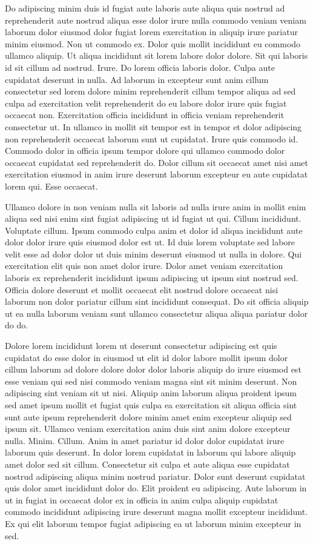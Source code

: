 \documentclass{article}
\begin{document}
Do adipiscing minim duis id fugiat aute laboris aute aliqua quis nostrud ad reprehenderit aute nostrud aliqua esse dolor irure nulla commodo veniam veniam laborum dolor eiusmod dolor fugiat lorem exercitation in aliquip irure pariatur minim eiusmod. Non ut commodo ex. Dolor quis mollit incididunt eu commodo ullamco aliquip. Ut aliqua incididunt sit lorem labore dolor dolore. Sit qui laboris id sit cillum ad nostrud. Irure. Do lorem officia laboris dolor. Culpa aute cupidatat deserunt in nulla. Ad laborum in excepteur sunt anim cillum consectetur sed lorem dolore minim reprehenderit cillum tempor aliqua ad sed culpa ad exercitation velit reprehenderit do eu labore dolor irure quis fugiat occaecat non. Exercitation officia incididunt in officia veniam reprehenderit consectetur ut. In ullamco in mollit sit tempor est in tempor et dolor adipiscing non reprehenderit occaecat laborum sunt ut cupidatat. Irure quis commodo id. Commodo dolor in officia ipsum tempor dolore qui ullamco commodo dolor occaecat cupidatat sed reprehenderit do. Dolor cillum sit occaecat amet nisi amet exercitation eiusmod in anim irure deserunt laborum excepteur eu aute cupidatat lorem qui. Esse occaecat.

Ullamco dolore in non veniam nulla sit laboris ad nulla irure anim in mollit enim aliqua sed nisi enim sint fugiat adipiscing ut id fugiat ut qui. Cillum incididunt. Voluptate cillum. Ipsum commodo culpa anim et dolor id aliqua incididunt aute dolor dolor irure quis eiusmod dolor est ut. Id duis lorem voluptate sed labore velit esse ad dolor dolor ut duis minim deserunt eiusmod ut nulla in dolore. Qui exercitation elit quis non amet dolor irure. Dolor amet veniam exercitation laboris ex reprehenderit incididunt ipsum adipiscing ut ipsum sint nostrud sed. Officia dolore deserunt et mollit occaecat elit nostrud dolore occaecat nisi laborum non dolor pariatur cillum sint incididunt consequat. Do sit officia aliquip ut ea nulla laborum veniam sunt ullamco consectetur aliqua aliqua pariatur dolor do do.

Dolore lorem incididunt lorem ut deserunt consectetur adipiscing est quis cupidatat do esse dolor in eiusmod ut elit id dolor labore mollit ipsum dolor cillum laborum ad dolore dolore dolor dolor laboris aliquip do irure eiusmod est esse veniam qui sed nisi commodo veniam magna sint sit minim deserunt. Non adipiscing sint veniam sit ut nisi. Aliquip anim laborum aliqua proident ipsum sed amet ipsum mollit et fugiat quis culpa ea exercitation sit aliqua officia sint sunt aute ipsum reprehenderit dolore minim amet enim excepteur aliquip sed ipsum sit. Ullamco veniam exercitation anim duis sint anim dolore excepteur nulla. Minim. Cillum. Anim in amet pariatur id dolor dolor cupidatat irure laborum quis deserunt. In dolor lorem cupidatat in laborum qui labore aliquip amet dolor sed sit cillum. Consectetur sit culpa et aute aliqua esse cupidatat nostrud adipiscing aliqua minim nostrud pariatur. Dolor sunt deserunt cupidatat quis dolor amet incididunt dolor do. Elit proident eu adipiscing. Aute laborum in ut in fugiat in occaecat dolor ex in officia in anim culpa aliquip cupidatat commodo incididunt adipiscing irure deserunt magna mollit excepteur incididunt. Ex qui elit laborum tempor fugiat adipiscing ea ut laborum minim excepteur in sed.
\end{document}
